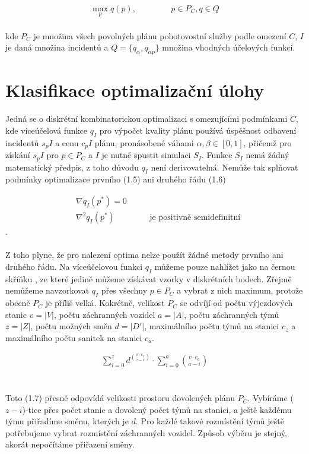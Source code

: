 \begin{definice}
  \begin{align}
    \max_{p} q(p), \hspace{50pt} p \in P_C, q \in Q 
  \end{align}
  \\
  kde $P_C$ je množina všech povolných plánu pohotovostní služby podle omezení $C$, $I$ je daná množina incidentů a $Q = \{ q_{\alpha}, q_{\alpha p}\}$ množina vhodných účelových funkcí.
\end{definice}


\section{Klasifikace optimalizační úlohy}

Jedná se o diskrétní kombinatorickou optimalizaci s omezujícími podmínkami $C$, kde víceúčelová funkce $q_I$ pro výpočet kvality plánu používá úspěšnost
odbavení incidentů $s_pI$ a cenu $c_pI$ plánu, pronásobené váhami $\alpha, \beta \in [0, 1]$,
přičemž pro získání $s_pI$ pro $p \in P_C$ a $I$ je nutné spustit simulaci $S_I$.
Funkce $S_I$ nemá žádný matematický předpis, z toho důvodu $q_I$ není derivovatelná.
Nemůže tak splňovat podmínky optimalizace prvního (1.5) ani druhého řádu (1.6) %

\begin{align}
  &\nabla q_I(p^*) = 0 \\
  &\nabla^2 q_I(p^*) \hspace{50pt} \text{je positivně semidefinitní}
\end{align}
.
\\
\\
Z toho plyne, že pro nalezení optima nelze použít žádné metody prvního ani druhého řádu. %
Na víceúčelovou funkci $q_I$ můžeme pouze nahlížet jako na černou skříňku %
, ze které jedině můžeme získávat vzorky v diskrétních bodech.
Zřejmě nemůžeme navzorkovat $q_I$ přes všechny $p \in P_C$ a vybrat z nich maximum, protože obecně $P_C$ je příliš velká.
Kokrétně, velikost $P_C$ se odvíjí od počtu výjezdových stanic $v = |V|$, počtu záchranných vozidel $a = |A|$, počtu záchranných týmů $z = |Z|$, počtu možných směn $d = |D'|$, 
maximálního počtu týmů na stanici $c_z$ a maximálního počtu sanitek na stanici $c_a$.

\begin{align}
  \sum_{i=0}^{z}{d^{v \cdot c_z \choose z - i}} \cdot \sum_{i = 0}^{a}{v \cdot c_a \choose a - i}
\end{align}
\\
\\
Toto (1.7) %
přesně odpovídá velikosti prostoru dovolených plánu $P_C$. Vybíráme ($z-i$)-tice přes počet stanic a dovolený počet týmů na stanici, a ještě každému týmu
přiřadíme směnu, kterých je $d$. Pro každé takové rozmístění týmů ještě potřebujeme vybrat rozmístění záchranných vozidel.
Způsob výběru je stejný, akorát nepočítáme přiřazení směny.

